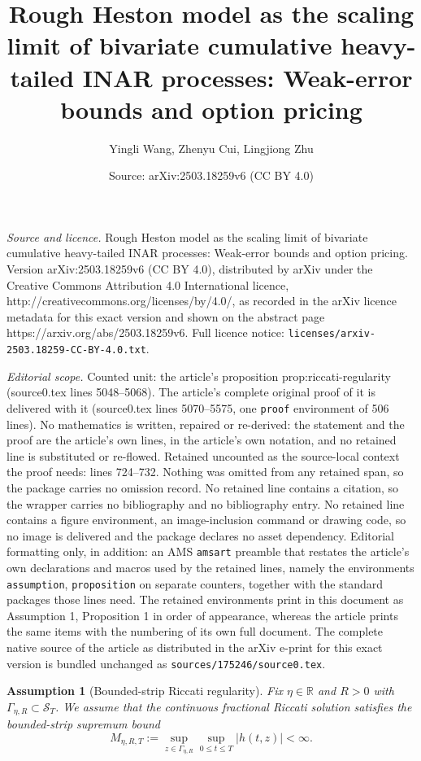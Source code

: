 \documentclass[10pt,a4paper]{amsart}
\title{Rough Heston model as the scaling limit of bivariate cumulative heavy-tailed INAR processes: Weak-error bounds and option pricing}
\author{Yingli Wang, Zhenyu Cui, Lingjiong Zhu}
\date{Source: arXiv:2503.18259v6 (CC BY 4.0)}
\newtheorem{assumption}{Assumption}
\newcommand{\R}{\mathbb{R}}
\begin{document}
\maketitle

\noindent\emph{Source and licence.} Rough Heston model as the scaling limit of bivariate cumulative heavy-tailed INAR processes: Weak-error bounds and option pricing. Version arXiv:2503.18259v6 (CC BY 4.0), distributed by arXiv under the Creative Commons Attribution 4.0 International licence, http://creativecommons.org/licenses/by/4.0/, as recorded in the arXiv licence metadata for this exact version and shown on the abstract page https://arxiv.org/abs/2503.18259v6. Full licence notice: \texttt{licenses/arxiv-2503.18259-CC-BY-4.0.txt}.\par\smallskip

\noindent\textit{Editorial scope.} Counted unit: the article's proposition prop:riccati-regularity (source0.tex lines 5048--5068). The article's complete original proof of it is delivered with it (source0.tex lines 5070--5575, one \texttt{proof} environment of 506 lines). No mathematics is written, repaired or re-derived: the statement and the proof are the article's own lines, in the article's own notation, and no retained line is substituted or re-flowed.  Retained uncounted as the source-local context the proof needs: lines 724--732.  Nothing was omitted from any retained span, so the package carries no omission record.  No retained line contains a citation, so the wrapper carries no bibliography and no bibliography entry.  No retained line contains a figure environment, an image-inclusion command or drawing code, so no image is delivered and the package declares no asset dependency.  Editorial formatting only, in addition: an AMS \texttt{amsart} preamble that restates the article's own declarations and macros used by the retained lines, namely the environments \texttt{assumption}, \texttt{proposition} on separate counters, together with the standard packages those lines need.  The retained environments print in this document as Assumption 1, Proposition 1 in order of appearance, whereas the article prints the same items with the numbering of its own full document.  The complete native source of the article as distributed in the arXiv e-print for this exact version is bundled unchanged as \texttt{sources/175246/source0.tex}.
\begin{assumption}[Bounded-strip Riccati regularity]\label{ass:riccati-bound}
Fix $\eta\in\R$ and $R>0$ with $\Gamma_{\eta,R}\subset\mathcal S_T$. We assume that the continuous fractional Riccati solution satisfies the bounded-strip supremum bound
\[
  M_{\eta,R,T}
  :=
  \sup_{z\in\Gamma_{\eta,R}}\sup_{0\le t\le T}|h(t,z)|
  <\infty.
\]
\end{assumption}
\end{document}
